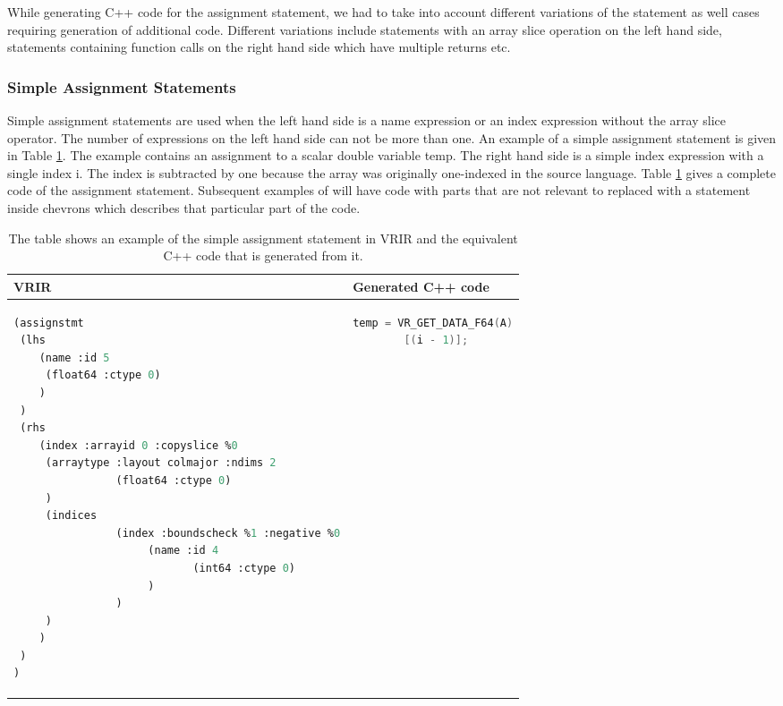 While generating C++ code for the assignment statement, we had to take into account different variations of the statement as well cases requiring generation of additional code. Different variations include statements with an array slice operation on the left hand side, statements containing function calls on the right hand side which have multiple returns etc. 

\subsubsection{Simple Assignment Statements}
Simple assignment statements are used when the left hand side is a name expression or an index expression without the array slice operator. The number of expressions on the left hand side can not be more than one. An example of a simple assignment statement is given in Table \ref{tab:simpleAssignment}. The example contains an assignment to a scalar double variable temp. The right hand side is a simple index expression with a single index i. The index is subtracted by one because the array was originally one-indexed in the source language. Table \ref{tab:simpleAssignment} gives a complete code of the assignment statement. Subsequent examples of will have code with parts that are not relevant to replaced with a statement inside chevrons which describes that particular part of the code.
	\begin{table}[htbp]
	\begin{tabular}{|l|l|}
					\hline
							VRIR & Generated C++ code\\
							\hline
{
\begin{lstlisting}[frame=none, language=lisp, label={lst:SimpleAssignment},numbers=none]
(assignstmt
 (lhs
	(name :id 5
	 (float64 :ctype 0)
	)
 )
 (rhs
	(index :arrayid 0 :copyslice %0
	 (arraytype :layout colmajor :ndims 2
				(float64 :ctype 0)
	 )
	 (indices
				(index :boundscheck %1 :negative %0
					 (name :id 4
							(int64 :ctype 0)
					 )
				)
	 )
	)
 )
)
\end{lstlisting}
} & 
{
\begin{lstlisting}[frame=none, language=c, label={lst:SimpleAssignment},numbers=none]
temp = VR_GET_DATA_F64(A)
		[(i - 1)];
\end{lstlisting}
} \\
\hline
\end{tabular}
\caption[Simple Assignment Statement]{ The table shows an example of the simple assignment statement in VRIR and the equivalent C++ code that is generated from it.}
\label{tab:simpleAssignment}
\end{table}

